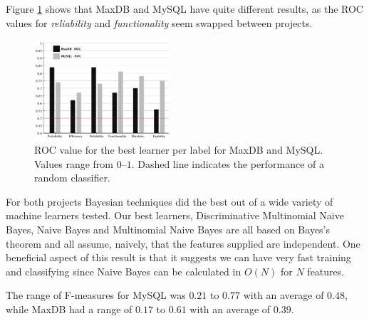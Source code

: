 \documentclass[smallextended]{svjour3}       %
\begin{document}
Figure \ref{fig:best-learn-per-tag} shows that MaxDB and MySQL have quite different results, as the ROC values for \emph{reliability} and \emph{functionality} seem swapped between projects. 

\begin{figure}[t]
\centering
\includegraphics[width=0.45\textwidth]{figures/both-supervised}
\caption[]{ROC value for the best learner per label for MaxDB and MySQL. Values range from $0$--$1$.  Dashed line indicates the performance of a random classifier.
}
\label{fig:best-learn-per-tag}
\end{figure}

For both projects Bayesian techniques did the best out of a wide variety of machine learners tested. 
Our best learners, Discriminative Multinomial Naive Bayes, Naive Bayes
and Multinomial Naive Bayes  are all based on Bayes's theorem and all
assume, naively, that the features supplied are independent. 
One beneficial aspect of this result is that it suggests we can have very fast training and classifying  since Naive Bayes can be calculated in $O(N)$ for $N$ features.


The range of F-measures for MySQL was $0.21$ to $0.77$ with an average
of $0.48$, while MaxDB had a range of $0.17$ to $0.61$ with an average
of $0.39$.
\end{document}
